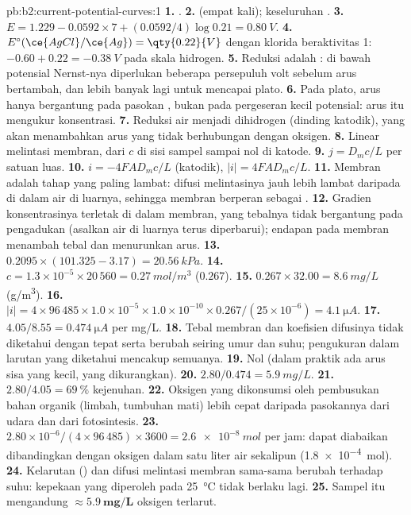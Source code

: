 \begin{solution}{pb:b2:current-potential-curves:1}
\textbf{1.} .
\textbf{2.}  (empat kali); keseluruhan
.
\textbf{3.} $E = 1.229 - 0.0592 \times 7 + (0.0592/4)\log 0.21 = \qty{0.80}{V}$.
\textbf{4.} $E^\circ(\ce{AgCl}/\ce{Ag}) = \qty{0.22}{V}$ dengan klorida
beraktivitas 1: $-0.60 + 0.22 = \qty{-0.38}{V}$ pada skala hidrogen.
\textbf{5.} Reduksi  adalah : di bawah potensial
Nernst-nya diperlukan  beberapa persepuluh volt sebelum arus
bertambah, dan lebih banyak lagi untuk mencapai plato.
\textbf{6.} Pada plato, arus hanya bergantung pada pasokan , bukan
pada pergeseran kecil potensial: arus itu mengukur konsentrasi.
\textbf{7.} Reduksi air menjadi dihidrogen (dinding katodik), yang akan
menambahkan arus yang tidak berhubungan dengan oksigen.
\textbf{8.} Linear melintasi membran, dari $c$ di sisi sampel sampai nol di
katode.
\textbf{9.} $j = D_m c/L$ per satuan luas.
\textbf{10.} $i = -4FAD_m c/L$ (katodik), $|i| = 4FAD_mc/L$.
\textbf{11.} Membran adalah tahap yang paling lambat: difusi melintasinya
jauh lebih lambat daripada di dalam air di luarnya, sehingga membran
berperan sebagai .
\textbf{12.} Gradien konsentrasinya terletak di dalam membran, yang tebalnya
tidak bergantung pada pengadukan (asalkan air di luarnya terus
diperbarui); endapan pada membran menambah tebal dan menurunkan arus.
\textbf{13.} $0.2095 \times (101.325 - 3.17) = \qty{20.56}{kPa}$.
\textbf{14.} $c = 1.3 \times 10^{-5} \times 20\,560 = \qty{0.27}{mol/m^3}$ ($0.267$).
\textbf{15.} $0.267 \times 32.00 = \qty{8.6}{mg/L}$ (\unit{g/m^3}).
\textbf{16.} $|i| = 4 \times 96\,485 \times 1.0 \times 10^{-5} \times 1.0 \times 10^{-10}
\times 0.267/(25 \times 10^{-6}) = \qty{4.1}{\micro A}$.
\textbf{17.} $4.05/8.55 = \qty{0.474}{\micro A}$ per \unit{mg/L}.
\textbf{18.} Tebal membran dan koefisien difusinya tidak diketahui dengan
tepat serta berubah seiring umur dan suhu; pengukuran dalam larutan yang
diketahui mencakup semuanya.
\textbf{19.} Nol (dalam praktik ada arus sisa yang kecil, yang
dikurangkan).
\textbf{20.} $2.80/0.474 = \qty{5.9}{mg/L}$.
\textbf{21.} $2.80/4.05 = 69~\%$ kejenuhan.
\textbf{22.} Oksigen yang dikonsumsi oleh pembusukan bahan organik (limbah,
tumbuhan mati) lebih cepat daripada pasokannya dari udara dan dari
fotosintesis.
\textbf{23.} $2.80 \times 10^{-6}/(4 \times 96\,485) \times 3600 = \qty{2.6e-8}{mol}$
per jam: dapat diabaikan dibandingkan dengan oksigen dalam satu liter air
sekalipun (\qty{1.8e-4}{mol}).
\textbf{24.} Kelarutan  () dan difusi melintasi membran
sama-sama berubah terhadap suhu: kepekaan yang diperoleh pada
\qty{25}{\degreeCelsius} tidak berlaku lagi.
\textbf{25.} Sampel itu mengandung $\boldsymbol{\approx \qty{5.9}{mg/L}}$
oksigen terlarut.
\end{solution}
